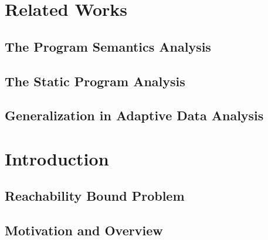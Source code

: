 \documentclass[12pt, letterpaper]{report}   %
\begin{document}
\chapter{Related Works}
\label{sec:adapt-relatedwork}

\section{The Program Semantics Analysis}
\label{sec:relatedwork-exe}



\section{The Static Program Analysis}
\label{sec:relatedwork-static}


\section{Generalization in Adaptive Data Analysis}
\label{sec:relatedwork-adapt}




\chapter*{ }

\chapter{Introduction }
\label{sec:reachability-intro}
\section{Reachability Bound Problem}
\label{sec:reachability-background}

\section{Motivation and Overview}
\label{sec:reachability-motivation}
\end{document}
